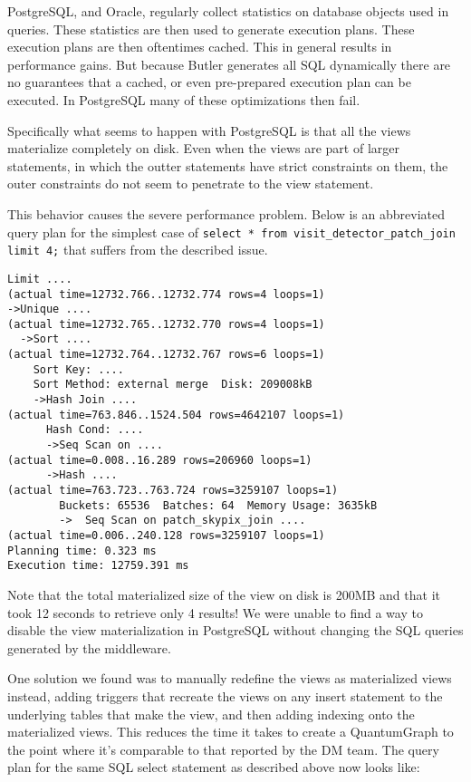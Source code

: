 PostgreSQL, and Oracle, regularly collect statistics on database objects used in queries.
These statistics are then used to generate execution plans.
These execution plans are then oftentimes cached.
This in general results in performance gains.
But because Butler generates all SQL dynamically there are no guarantees that a cached, or even pre-prepared execution plan can be executed.
In PostgreSQL many of these optimizations then fail.

Specifically what seems to happen with PostgreSQL is that all the views materialize completely on disk.
Even when the views are part of larger statements, in which the outter statements have strict constraints on them, the outer constraints do not seem to penetrate to the view statement.


This behavior causes the severe performance problem.
Below is an abbreviated query plan for the simplest case of \lstinline[basicstyle=\ttfamily]{select * from visit_detector_patch_join limit 4;} that suffers from the described issue.

\begin{lstlisting}[style=sqlprompt]
Limit ....
(actual time=12732.766..12732.774 rows=4 loops=1)
->Unique ....
(actual time=12732.765..12732.770 rows=4 loops=1)
  ->Sort ....
(actual time=12732.764..12732.767 rows=6 loops=1)
    Sort Key: ....
    Sort Method: external merge  Disk: 209008kB
    ->Hash Join ....
(actual time=763.846..1524.504 rows=4642107 loops=1)
      Hash Cond: ....
      ->Seq Scan on ....
(actual time=0.008..16.289 rows=206960 loops=1)
      ->Hash ....
(actual time=763.723..763.724 rows=3259107 loops=1)
        Buckets: 65536  Batches: 64  Memory Usage: 3635kB
        ->  Seq Scan on patch_skypix_join ....
(actual time=0.006..240.128 rows=3259107 loops=1)
Planning time: 0.323 ms
Execution time: 12759.391 ms
\end{lstlisting}

Note that the total materialized size of the view on disk is 200MB and that it took 12 seconds to retrieve only 4 results!
We were unable to find a way to disable the view materialization in PostgreSQL without changing the SQL queries generated by the middleware.

One solution we found was to manually redefine the views as materialized views instead, adding triggers that recreate the views on any insert statement to the underlying tables that make the view, and then adding indexing onto the materialized views.
This reduces the time it takes to create a QuantumGraph to the point where it's comparable to that reported by the DM team.
The query plan for the same SQL select statement as described above now looks like:

